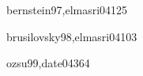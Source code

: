 \begin{syllabus}
    \begin{unit}{\IMTransactionProcessing}{}{bernstein97,elmasri04}{12}{5}
        \IMTransactionProcessingAllTopics
        \IMTransactionProcessingAllLearningOutcomes
    \end{unit}
    
    \begin{unit}{\IMInformationStorageandRetrieval}{}{brusilovsky98,elmasri04}{10}{3}
        \IMInformationStorageandRetrievalAllTopics
        \IMInformationStorageandRetrievalAllLearningOutcomes
    \end{unit}
    
    \begin{unit}{\IMDistributedDatabases}{}{ozsu99,date04}{36}{4}
        \IMDistributedDatabasesAllTopics
        \IMDistributedDatabasesAllLearningOutcomes
    \end{unit}
    
    \begin{coursebibliography}
    \end{coursebibliography}
    
    \end{syllabus}
    
    